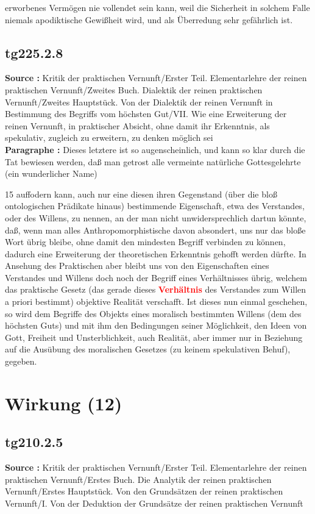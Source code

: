 \documentclass[a4paper,12pt,twoside]{book}
\newcommand{\match}[1]{\textcolor{red}{\textbf{#1}}}
\newcommand{\unnumberedsection}[1]{
	\section*{#1}
	\addcontentsline{toc}{section}{#1}
	\markright{#1}
}
\begin{document}
erworbenes Vermögen nie vollendet sein kann, weil die Sicherheit in solchem Falle niemals apodiktische Gewißheit wird, und als Überredung sehr gefährlich ist. 
	
	\subsection*{tg225.2.8} 
	\textbf{Source : }Kritik der praktischen Vernunft/Erster Teil. Elementarlehre der reinen praktischen Vernunft/Zweites Buch. Dialektik der reinen praktischen Vernunft/Zweites Hauptstück. Von der Dialektik der reinen Vernunft in Bestimmung des Begriffs vom höchsten Gut/VII. Wie eine Erweiterung der reinen Vernunft, in praktischer Absicht, ohne damit ihr Erkenntnis, als spekulativ, zugleich zu erweitern, zu denken möglich sei\\  
	
	\noindent\textbf{Paragraphe : }Dieses letztere ist so augenscheinlich, und kann so klar durch die Tat bewiesen werden, daß man getrost alle vermeinte natürliche Gottesgelehrte (ein wunderlicher Name)
	
	
	15
	auffodern kann, auch nur eine diesen ihren Gegenstand (über die bloß ontologischen Prädikate hinaus) bestimmende Eigenschaft, etwa des Verstandes, oder des Willens, zu nennen, an der man nicht unwidersprechlich dartun könnte, daß, wenn man alles Anthropomorphistische davon absondert, uns nur das bloße Wort übrig bleibe, ohne damit den mindesten Begriff verbinden zu können, dadurch eine Erweiterung der theoretischen Erkenntnis gehofft werden dürfte. In Ansehung des Praktischen aber bleibt uns von den Eigenschaften eines Verstandes und Willens doch noch der Begriff eines Verhältnisses übrig, welchem das praktische Gesetz (das gerade dieses \match{Verhältnis} des Verstandes zum Willen a priori bestimmt) objektive Realität verschafft. Ist dieses nun einmal geschehen, so wird dem Begriffe des Objekts eines moralisch bestimmten Willens (dem des höchsten Guts) und mit ihm den Bedingungen seiner Möglichkeit, den Ideen von Gott, Freiheit und Unsterblichkeit, auch Realität, aber immer nur in Beziehung auf die Ausübung des moralischen Gesetzes (zu keinem spekulativen Behuf), gegeben. 
	
	\unnumberedsection{Wirkung (12)} 
	\subsection*{tg210.2.5} 
	\textbf{Source : }Kritik der praktischen Vernunft/Erster Teil. Elementarlehre der reinen praktischen Vernunft/Erstes Buch. Die Analytik der reinen praktischen Vernunft/Erstes Hauptstück. Von den Grundsätzen der reinen praktischen Vernunft/I. Von der Deduktion der Grundsätze der reinen praktischen Vernunft\\  
	
\end{document}
